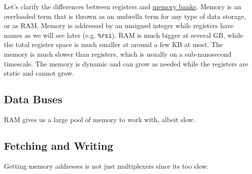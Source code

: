   Let's clarify the differences between registers and \hyperref[def:memory-bank]{memory banks}. Memory is an overloaded term that is thrown as an umbrella term for any type of data storage, or as RAM. Memory is addressed by an unsigned integer while registers have names as we will see later (e.g. \texttt{\%rsi}). RAM is much bigger at several GB, while the total register space is much smaller at around a few KB at most. The memory is much slower than registers, which is usually on a sub-nanosecond timescale. The memory is dynamic and can grow as needed while the registers are static and cannot grow.

\subsection{Data Buses} 

  RAM gives us a large pool of memory to work with, albeit slow. 

\subsection{Fetching and Writing} 

  Getting memory addresses is not just multiplexers since its too slow. 


